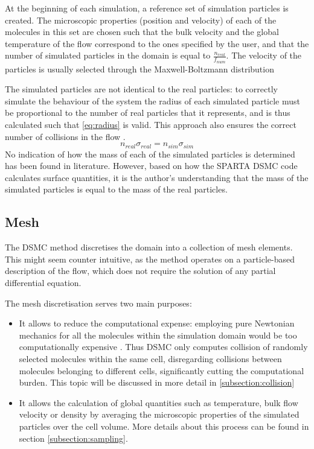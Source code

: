 At the beginning of each simulation, a reference set of simulation particles is created. The microscopic properties (position and velocity) of each of the molecules in this set are chosen such that the bulk velocity and the global temperature of the flow correspond to the ones specified by the user, and that the number of simulated particles in the domain is equal to $\frac{n_{real}}{f_{num}}$. The velocity of the particles is usually selected through the Maxwell-Boltzmann distribution \cite{natodsmc}

The simulated particles are not identical to the real particles: to correctly simulate the behaviour of the system the radius of each simulated particle must be proportional to the number of real particles that it represents, and is thus calculated such that \autoref{eq:radius} is valid. This approach also ensures the correct number of collisions in the flow \cite{dsmcnotes}.
\begin{equation}
    n_{real}  \sigma_{real} = n_{sim}  \sigma_{sim}
    \label{eq:radius}
\end{equation}
No indication of how the mass of each of the simulated particles is determined has been found in literature. However, based on how the SPARTA DSMC code calculates surface quantities, it is the author's understanding that the mass of the simulated particles is equal to the mass of the real particles.

\subsection{Mesh}
The DSMC method discretises the domain into a collection of mesh elements. This might seem counter intuitive, as the method operates on a particle-based description of the flow, which does not require the solution of any partial differential equation.

The mesh discretisation serves two main purposes: 

\begin{itemize}
    \item It allows to reduce the computational expense: employing pure Newtonian mechanics for all the molecules within the simulation domain would be too computationally expensive \cite{themontecarlo}. Thus DSMC only computes collision of randomly selected molecules within the same cell, disregarding collisions between molecules belonging to different cells, significantly cutting the computational burden. This topic will be discussed in more detail in \autoref{subsection:collision}
    \item It allows the calculation of global quantities such as temperature, bulk flow velocity or density by averaging the microscopic properties of the simulated particles over the cell volume. More details about this process can be found in section \autoref{subsection:sampling}.
\end{itemize}

